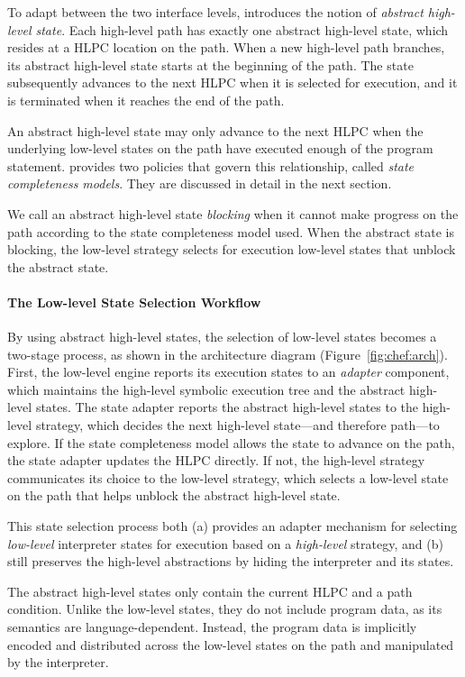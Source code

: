 To adapt between the two interface levels, \chef introduces the notion of \emph{abstract high-level state}.
%
Each high-level path has exactly one abstract high-level state, which resides at a HLPC location on the path.
%
When a new high-level path branches, its abstract high-level state starts at the beginning of the path.
%
The state subsequently advances to the next HLPC when it is selected for execution, and it is terminated when it reaches the end of the path.


An abstract high-level state may only advance to the next HLPC when the underlying low-level states on the path have executed enough of the program statement.
%
\chef provides two policies that govern this relationship, called \emph{state completeness models}.  They are discussed in detail in the next section.


We call an abstract high-level state \emph{blocking} when it cannot make progress on the path according to the state completeness model used.
%
When the abstract state is blocking, the low-level strategy selects for execution low-level states that unblock the abstract state.

\paragraph{The Low-level State Selection Workflow}

By using abstract high-level states, the selection of low-level states becomes a two-stage process, as shown in the architecture diagram (Figure~\ref{fig:chef:arch}).
%
First, the low-level engine reports its execution states to an \emph{adapter} component, which maintains the high-level symbolic execution tree and the abstract high-level states.
%
The state adapter reports the abstract high-level states to the high-level strategy, which decides the next high-level state---and therefore path---to explore.
%
If the state completeness model allows the state to advance on the path, the state adapter updates the HLPC directly.
%
If not, the high-level strategy communicates its choice to the low-level strategy, which selects a low-level state on the path that helps unblock the abstract high-level state.


This state selection process both (a) provides an adapter mechanism for selecting \emph{low-level} interpreter states for execution based on a \emph{high-level} strategy, and (b) still preserves the high-level abstractions by hiding the interpreter and its states.


The abstract high-level states only contain the current HLPC and a path condition.
%
Unlike the low-level states, they do not include program data, as its semantics are language-dependent.
%
Instead, the program data is implicitly encoded and distributed across the low-level states on the path and manipulated by the interpreter.

